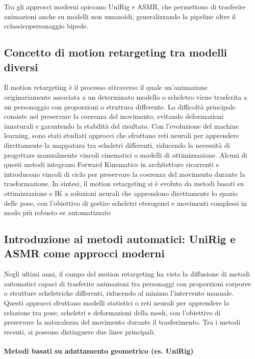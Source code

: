 \begin{itemize}
Tra gli approcci moderni spiccano UniRig e ASMR, che permettono di trasferire animazioni anche su modelli non umanoidi, generalizzando la pipeline oltre il cclassicopersonaggio bipede.

\subsection{Concetto di motion retargeting tra modelli diversi}
Il motion retargeting è il processo attraverso il quale un'animazione originariamente associata a un determinato modello o scheletro viene trasferita a un personaggio con proporzioni o struttura differente. La difficoltà principale consiste nel preservare la coerenza del movimento, evitando deformazioni innaturali e garantendo la stabilità del risultato.
Con l'evoluzione del machine learning, sono stati studiati approcci che sfruttano reti neurali per apprendere direttamente la mappatura tra scheletri differenti, riducendo la necessità di progettare manualmente vincoli cinematici o modelli di ottimizzazione. Alcuni di questi metodi integrano Forward Kinematics in architetture ricorrenti e introducono vincoli di ciclo per preservare la coerenza del movimento durante la trasformazione.
In sintesi, il motion retargeting si è evoluto da metodi basati su ottimizzazione e IK a soluzioni neurali che apprendono direttamente lo spazio delle pose, con l'obiettivo di gestire scheletri eterogenei e movimenti complessi in modo più robusto ee automatizzato

\subsection{Introduzione ai metodi automatici: UniRig e ASMR come approcci moderni}
Negli ultimi anni, il campo del motion retargeting ha visto la diffusione di metodi automatici capaci di trasferire animazioni tra personaggi con proporzioni corporee o strutture scheletriche differenti, riducendo al minimo l'intervento manuale. Questi approcci sfruttano modelli statistici o reti neurali per apprendere la relazione tra pose, scheletri e deformazioni della mesh, con l'obiettivo di preservare la naturalezza del movimento durante il trasferimento.
Tra i metodi recenti, si possono distinguere due linee principali:

\paragraph{Metodi basati su adattamento geometrico (es. UniRig)}


\end{itemize}
